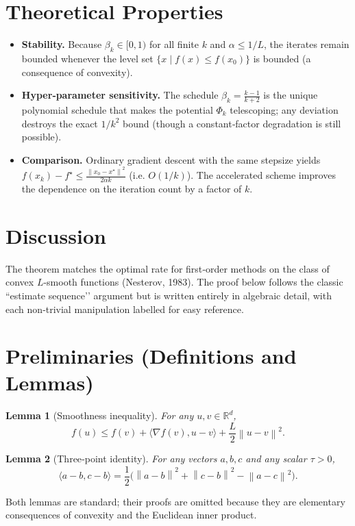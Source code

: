 \documentclass{article}
\newtheorem{lemma}{Lemma}
\newcommand{\grad}{\nabla}
\newcommand{\norm}[1]{\left\|#1\right\|}
\begin{document}
\section*{Theoretical Properties}
\begin{itemize}
\item \textbf{Stability.} Because \(\beta_k\in[0,1)\) for all finite
\(k\) and \(\alpha\le 1/L\), the iterates remain bounded whenever the
level set \(\{x\mid f(x)\le f(x_0)\}\) is bounded (a consequence of convexity).
\item \textbf{Hyper‑parameter sensitivity.} The schedule
\(\beta_k=\frac{k-1}{k+2}\) is the unique polynomial schedule that makes
the potential \(\Phi_k\) telescoping; any deviation destroys the exact
\(1/k^2\) bound (though a constant‑factor degradation is still possible).
\item \textbf{Comparison.} Ordinary gradient descent with the same stepsize
yields \(f(x_k)-f^\star\le \frac{\norm{x_0-x^\star}^2}{2\alpha k}\) (i.e.
\(O(1/k)\)).  The accelerated scheme improves the dependence on the
iteration count by a factor of \(k\).
\end{itemize}

\section*{Discussion}
The theorem matches the optimal rate for first‑order methods on the class
of convex \(L\)-smooth functions (Nesterov, 1983).  The proof below follows
the classic ``estimate sequence’’ argument but is written entirely in
algebraic detail, with each non‑trivial manipulation labelled for easy
reference.

\newpage
\section*{Preliminaries (Definitions and Lemmas)}
\begin{lemma}[Smoothness inequality]\label{lem:smooth}
For any \(u,v\in\mathbb{R}^d\),
\[
f(u)\le f(v)+\langle\grad f(v),u-v\rangle+\frac{L}{2}\norm{u-v}^2.
\]
\end{lemma}
\begin{lemma}[Three‑point identity]\label{lem:three}
For any vectors \(a,b,c\) and any scalar \(\tau>0\),
\[
\langle a-b,c-b\rangle=
\frac{1}{2}\bigl(\norm{a-b}^2+\norm{c-b}^2-\norm{a-c}^2\bigr).
\]
\end{lemma}
Both lemmas are standard; their proofs are omitted because they are
elementary consequences of convexity and the Euclidean inner product.
\end{document}
